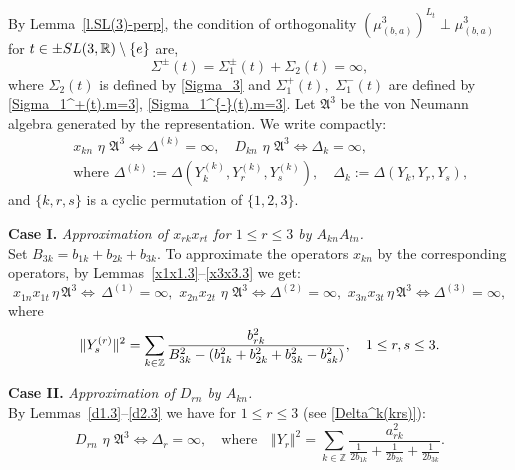 \documentclass[preprint,12pt]{elsarticle}
\numberwithin{equation}{section}
\begin{document}
\begin{pf}
By Lemma~\ref{l.SL(3)-perp}, 
the condition of orthogonality $(\mu_{(b,a)}^3)^{L_t}\perp\mu_{(b,a)}^3$ 
for   $t\in \pm{\rm SL}(3,\mathbb R)\setminus\{e\}$ are,
\begin{equation}
 \label{III}
\Sigma^{\pm}(t)=\Sigma_1^{\pm}(t)+\Sigma_2(t)=\infty,
\end{equation}
where    $\Sigma_2(t)$  is defined by \eqref{Sigma_3} and 
$\Sigma_1^+(t),\,\,\Sigma_1^{-}(t)$ are defined by \eqref{Sigma_1^+(t).m=3}, \eqref{Sigma_1^{-}(t).m=3}.
Let ${\mathfrak A}^3$ be the von Neumann algebra generated by the representation. 
We write compactly:
\begin{eqnarray}
 \label{x,D-eta-A^3}
&&
x_{kn}\,\,\eta\,\, {\mathfrak A}^3\Leftrightarrow \Delta^{(k)}=\infty,\quad
D_{kn}\,\,\eta\,\, {\mathfrak A}^3\Leftrightarrow \Delta_k=\infty,\\
\label{Delta^k(krs)}
&&\text{where}\,\,\Delta^{(k)}:=\Delta(Y_k^{(k)},Y_r^{(k)},Y_s^{(k)}),\quad
\Delta_k:=\Delta(Y_k,Y_r,Y_s),
\end{eqnarray}
and $\{k,r,s\}$ is a cyclic permutation of $\{1,2,3\}$.

{\bf Case I.} {\it  Approximation of $x_{rk}x_{rt}$ for $1\leq r\leq 3$ by $A_{kn}A_{tn}$.}\\
Set $B_{3k}=b_{1k}+b_{2k}+b_{3k}$. To approximate the operators  $x_{kn}$  by the corresponding operators,
by  Lemmas~\ref{x1x1.3}--\ref{x3x3.3} we get:
%
\begin{equation} 
\label{I} 
x_{1n}x_{1t}\,\eta\, {\mathfrak A}^3\Leftrightarrow \,\Delta^{(1)}=\infty,\,\,
x_{2n}x_{2t}\,\,\eta\,\,{\mathfrak A}^3\Leftrightarrow \Delta^{(2)}=\infty,\,\,
x_{3n}x_{3t}\,\eta\, {\mathfrak A}^3\Leftrightarrow \Delta^{(3)}=\infty,
\end{equation}
%
where
\begin{equation}
\label{Y_r^{(s)}}
\Vert Y_s^{(r)} \Vert^2=\sum_{k\in \mathbb Z}
\frac{b_{rk}^2}{B_{3k}^2-(b_{1k}^2+b_{2k}^2+b_{3k}^2-b_{sk}^2)},\quad 1\leq r,s\leq 3. 
\end{equation}


{\bf Case II.} {\it  Approximation of $D_{rn}$ by $A_{kn}$.}\\

By Lemmas~\ref{d1.3}--\ref{d2.3} we have for $1\leq r\leq 3$ (see \eqref{Delta^k(krs)}):
%
\begin{equation}
\label{II}
D_{rn}\,\,\eta\,\,{\mathfrak A}^3\Leftrightarrow \Delta_r=\infty,\quad\text{where}\quad \Vert Y_r\Vert^2=\sum_{k\in \mathbb Z}\frac{a_{rk}^2}{\frac{1}{2b_{1k}}+\frac{1}{2b_{2k}}+\frac{1}{2b_{3k}}}.
\end{equation}


\end{pf}
\end{document}
